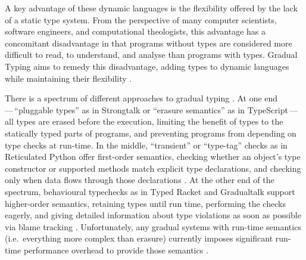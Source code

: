 
A key advantage of these dynamic languages is the flexibility offered
by the lack of a static type system. 
From the perspective of many computer scientists, software engineers,
and computational theologists, this advantage has a concomitant
disadvantage in that programs without types are considered more
difficult to read, to understand, and analyse than programs with
types. Gradual Typing aims to remedy this disadvantage, adding types
to dynamic languages while maintaining their flexibility
\citep{GiladPluggable2004,Siek2006,XXXSiek2015}. 

There is a spectrum of different approaches to gradual typing
\cite{kafka18,bensurvey18icfp}.
At one end\,---\,``pluggable types'' as in Strongtalk \cite{strongtalk} or ``erasure
semantics'' as in 
TypeScript\citep{typeScriptECOOP}\,---\,
%
all types are erased before the execution, limiting the benefit of
types to the statically typed parts of programs, and preventing
programs from depending on type checks at run-time.  In the middle,
``transient'' or ``type-tag'' checks as in Reticulated Python 
offer first-order semantics, checking
whether an object's type constructor or supported methods match
explicit type declarations, and checking only when data flows through
those declarations \cite{Siek2007,Bloom2009,concrete15,reticPython2014,Greenman2018}.  At the other end of the spectrum, behavioural
typechecks as in Typed Racket \cite{typedScheme08,takikawa2012} and Gradualtalk \cite{gradualtalk14} support higher-order semantics, retaining
types until run 
time, performing the checks eagerly, and giving detailed information
about type violations as soon as possible via blame
tracking \cite{blame2009,blameForAll2011}.
%
%
Unfortunately, any gradual systems with run-time semantics
(i.e.\ everything more complex than erasure) currently
imposes significant run-time performance overhead to provide those semantics
\citep{Takikawa2016,Vitousek2017,Muehlboeck2017,Bauman2017,Richards2017,Stulova2016,Greenman2018}.

